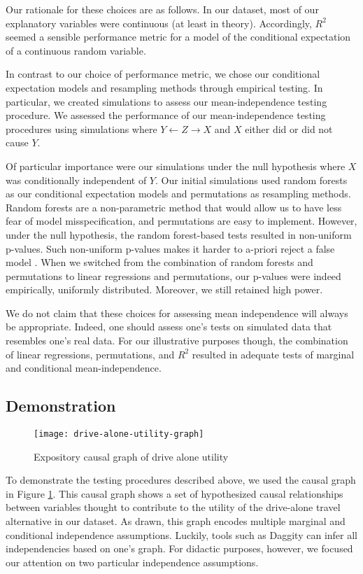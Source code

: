 Our rationale for these choices are as follows.
In our dataset, most of our explanatory variables were continuous (at least in theory).
Accordingly, $R^2$ seemed a sensible performance metric for a model of the conditional expectation of a continuous random variable.

In contrast to our choice of performance metric, we chose our conditional expectation models and resampling methods through empirical testing.
In particular, we created simulations to assess our mean-independence testing procedure.
We assessed the performance of our mean-independence testing procedures using simulations where $Y \leftarrow Z \rightarrow X$ and $X$ either did or did not cause $Y$.

Of particular importance were our simulations under the null hypothesis where $X$ was conditionally independent of $Y$.
Our initial simulations used random forests as our conditional expectation models and permutations as resampling methods.
Random forests are a non-parametric method that would allow us to have less fear of model misspecification, and permutations are easy to implement.
However, under the null hypothesis, the random forest-based tests resulted in non-uniform p-values.
Such non-uniform p-values makes it harder to a-priori reject a false model \citep{gelman_2013_two}.
When we switched from the combination of random forests and permutations to linear regressions and permutations, our p-values were indeed empirically, uniformly distributed.
Moreover, we still retained high power.

We do not claim that these choices for assessing mean independence will always be appropriate.
Indeed, one should assess one's tests on simulated data that resembles one's real data.
For our illustrative purposes though, the combination of linear regressions, permutations, and $R^2$ resulted in adequate tests of marginal and conditional mean-independence.

\subsection{Demonstration}
\label{sec:testing-demonstration}

\begin{figure}
   \centering
   \texttt{[image: drive-alone-utility-graph]}
   \caption{Expository causal graph of drive alone utility}
   \label{fig:graph-for-testing}
\end{figure}
To demonstrate the testing procedures described above, we used the causal graph in Figure \ref{fig:graph-for-testing}.
This causal graph shows a set of hypothesized causal relationships between variables thought to contribute to the utility of the drive-alone travel alternative in our dataset.
As drawn, this graph encodes multiple marginal and conditional independence assumptions.
Luckily, tools such as Daggity \citep{textor_2016_robust} can infer all independencies based on one's graph.
For didactic purposes, however, we focused our attention on two particular independence assumptions.

